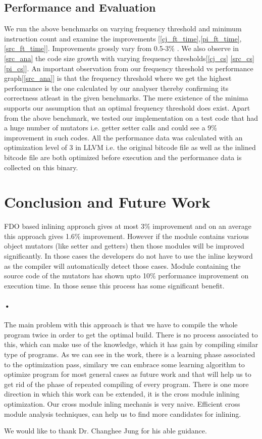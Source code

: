 \documentclass{sigplanconf}
\begin{document}
 
\subsection{Performance and Evaluation}
We run the above benchmarks on varying frequency threshold and minimum instruction count and examine the improvements [\ref{cj_ft_time},\ref{pi_ft_time},\ref{src_ft_time}]. Improvements grossly vary from 0.5-3\% . We also observe in \ref{src_ana} the code size growth with varying frequency thresholds[\ref{cj_cs} \ref{src_cs} \ref{pi_cs}]. An important observation from our frequency threshold vs performance graph[\ref{src_ana}] is that the frequency threshold where we get the highest performance is the one calculated by  our analyser thereby confirming its correctness atleast in the given benchmarks. The mere existence of the minima supports our assumption that an optimal frequency threshold does exist.
Apart from the above benchmark, we tested our implementation on a test code that had a huge number of mutators i.e. getter setter calls and could see a 9\% improvement in such codes.
All the performance data was calculated with an optimization level of 3 in LLVM i.e. the original bitcode file as well as the inlined bitcode file are both optimized before execution and the performance data is collected on this binary.  


\section{Conclusion and Future Work}
FDO based inlining approach gives at most 3\% improvement and on an average this approach gives 1.6\% improvement. However if the module contains various object mutators (like setter and getters) then those modules will be improved significantly. In those cases the developers do not have to use the inline keyword as the compiler will automatically detect those cases. Module containing the source code of the mutators has shown upto 10\% performance improvement on execution time. In those sense this process has some significant benefit. 
\paragraph*{•} The main problem with this approach is that we have to compile the whole program twice in order to get the optimal build. There is no process associated to this, which can make use of the knowledge, which it has gain by compiling similar type of programs. As we can see in the \cite{diego} work, there is a learning phase  associated to the optimization pass, similary  we can embrace some learning algorithm to optimize program for most general cases as future work and that will help us to get rid of the phase of repeated compiling of every program. There is one more direction in which this work can be extended, it is the cross module inlining optimization. Our cross module inling mechanis is very naive. Efficient cross module  analysis techniques, can help us to find more candidates for inlining.

\acks
We would like to thank Dr. Changhee Jung for his able guidance.



\end{document}
